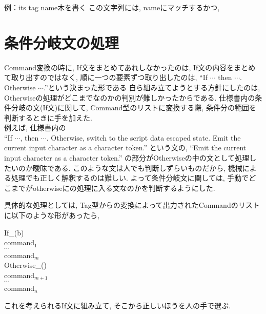\documentclass[uplatex,a4j]{jsreport}
\begin{document}
例：its tag name木を書く
この文字列には, nameにマッチするかつ, 

\section{条件分岐文の処理}
Command変換の時に, If文をまとめてあれしなかったのは, 
If文の内容をまとめて取り出すのではなく, 順に一つの要素ずつ取り出したのは, 
``If $\cdots$ then $\cdots$. Otherwise $\cdots$.''という決まった形である
自ら組み立てようとする方針にしたのは, Otherwiseの処理がどこまでなのかの判別が難しかったからである.
仕様書内の条件分岐の文(If文)に関して, Command型のリストに変換する際, 条件分の範囲を判断するときに手を加えた.\\
例えば, 仕様書内の\\
``If $\cdots$, then $\cdots$. Otherwise, switch to the script data escaped state. Emit the current input character as a character token.''
という文の, ``Emit the current input character as a character token.'' の部分がOtherwiseの中の文として処理したいのか曖昧である. 
このような文は人でも判断しずらいものだから, 機械による処理でも正しく解釈するのは難しい.
よって条件分岐文に関しては, 手動でどこまでがotherwiseにの処理に入る文なのかを判断するようにした. 

具体的な処理としては, 
Tag型からの変換によって出力されたCommandのリストに以下のような形があったら, 
\begin{screen}
      If_(b)\\
      command$_1$\\
      $\cdots$\\
      command$_m$\\
      Otherwise_()\\
      command$_{m+1}$\\
      $\cdots$\\
      command$_n$
\end{screen}
これを考えられるIf文に組み立て, そこから正しいほうを人の手で選ぶ. \\
\end{document}
